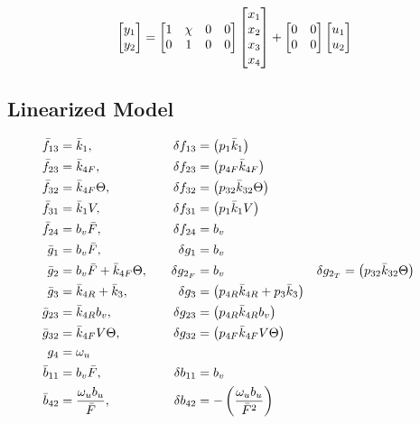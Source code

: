 \begin{equation}\label{eqn::ctrl_out}
    \begin{bmatrix} y_1 \\ y_2 \end{bmatrix} = \begin{bmatrix} 1 & \chi & 0 & 0 \\
                                 0 & 1       & 0 & 0 \end{bmatrix}
                            \begin{bmatrix} x_1 \\ x_2 \\ x_3 \\ x_4 \end{bmatrix} +
                            \begin{bmatrix} 0 & 0 \\
                                0 & 0 \\ \end{bmatrix}
                            \begin{bmatrix} u_1 \\ u_2 \end{bmatrix}
\end{equation}


\subsection{Linearized Model}
\begin{align*}
     \bar f_{13} &= \bar k_{1}, \quad&
    \delta f_{13} &= \left(  p_{1} \bar k_{1}  \right) \\
     \bar f_{23} &= \bar k_{4F}, \quad &
    \delta f_{23}  &= \left(  p_{4F} \bar k_{4F}  \right) \\
     \bar f_{32} &= \bar k_{4F} \Theta, \quad &
    \delta f_{32}  &= \left(  p_{32}  \bar k_{32} \Theta  \right)
    \\
     \bar f_{31} &= \bar k_1 V, \quad &
    \delta f_{31}  &= \left(  p_1 \bar k_1 V  \right)
    \\
     \bar f_{24} &= b_v \bar F,
    \quad &
    \delta f_{24}  &= b_v
    \\
     \bar g_1 &= b_v \bar F,
    \quad &
    \delta g_1  &= b_v
    \\
    \bar g_2 &= b_v \bar F + \bar k_{4F} \Theta,
    \quad &
    \delta g_{2_F}  &= b_v
    \quad &
    \delta g_{2_T} &= \left(  p_{32}  \bar k_{32}  \Theta  \right)
    \\
    \bar g_3 &= \bar k_{4R} + \bar k_3,
    \quad &
    \delta g_3 &= \left(  p_{4R} \bar k_{4R} + p_3 \bar k_3 \right)
    \\
    \bar g_{23} &= \bar k_{4R} b_v,
    \quad &
    \delta g_{23}  &= \left(  p_{4R} \bar k_{4R} b_v  \right)
    \\
    \bar g_{32} &= \bar k_{4F} V \Theta,
    \quad &
    \delta g_{32}  &= \left(  p_{4F} \bar k_{4F} V \Theta  \right)
    \\
    g_4 &= \omega_u
    \\
    \bar b_{11} &= b_v \bar F,
    \quad &
    \delta b_{11} &= b_v
    \\
    \bar b_{42} &= \frac{\omega_u b_u}{\bar F},
    \quad &
    \delta b_{42}  &= -\left( \frac{\omega_u b_u}{\bar F^2} \right)
\end{align*}


